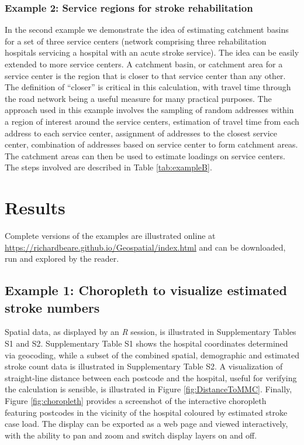 \documentclass[utf8]{frontiersHLTH}
\begin{document}
\subsubsection{Example 2: Service regions for stroke rehabilitation}\label{example-2-service-regions-for-stroke-rehabilitation} In the second example we demonstrate the idea of estimating catchment basins for a set of three service centers (network comprising three rehabilitation hospitals servicing a hospital with an acute stroke service). The idea can be easily extended to more service centers. A catchment basin, or catchment area for a service center is the region that is closer to that service center than any other. The definition of ``closer'' is critical in this calculation, with travel time through the road network being a useful measure for many practical purposes. The approach used in this example involves the sampling of random addresses within a region of interest around the service centers, estimation of travel time from each address to each service center, assignment of addresses to the closest service center, combination of addresses based on service center to form catchment areas. The catchment areas can then be used to estimate loadings on service centers. The steps involved are described in Table \ref{tab:exampleB}. 

\section{Results} Complete versions of the examples are illustrated online at \href{https://richardbeare.github.io/Geospatial/index.html}{https://richardbeare.github.io/Geospatial/index.html} and can be downloaded, run and explored by the reader. 

\subsection{Example 1: Choropleth to visualize estimated stroke numbers} Spatial data, as displayed by an {\em R} session, is illustrated in Supplementary Tables S1 and S2. Supplementary Table S1 shows the hospital coordinates determined via geocoding, while a subset of the combined spatial, demographic and estimated stroke count data is illustrated in Supplementary Table S2. A visualization of straight-line distance between each postcode and the hospital, useful for verifying the calculation is sensible, is illustrated in Figure \ref{fig:DistanceToMMC}. Finally, Figure \ref{fig:choropleth} provides a screenshot of the interactive choropleth featuring postcodes in the vicinity of the hospital coloured by estimated stroke case load. The display can be exported as a web page and viewed interactively, with the ability to pan and zoom and switch display layers on and off. 
\end{document}
